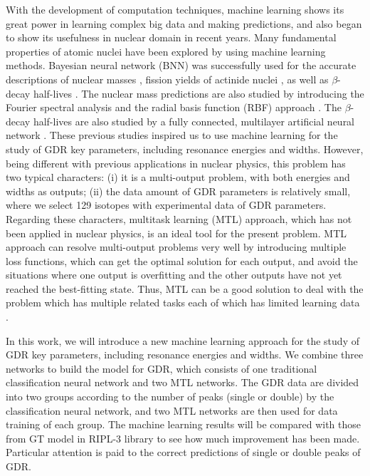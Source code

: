 \documentclass[twocolumn,showpacs,superscriptaddress,amsmath,amssymb,prc,preprintnumbers]{revtex4-1}
\begin{document}
With the development of computation techniques, machine learning shows its great power in learning complex big data and making predictions, and also began to show its usefulness in nuclear domain in recent years.
Many fundamental properties of atomic nuclei have been explored by using machine learning methods.
Bayesian neural network (BNN) was successfully used for the accurate descriptions of  nuclear masses \cite{Niu201848,Niu20198,Utama2016,Neufcourt2018}, fission yields of actinide nuclei \cite{WangZiAo2019}, as well as $\beta$-decay half-lives \cite{NiuZM2019}.
The nuclear mass predictions are also studied by introducing the Fourier spectral analysis \cite{Niu2018scibull} and the radial basis function (RBF) approach \cite{Niu2016}.
The $\beta$-decay half-lives are also studied by a fully connected, multilayer artificial neural network \cite{Costiris2009,Costiris2013}.
These previous studies inspired us to use  machine learning for the study of GDR key parameters, including resonance energies and widths. However, being different with previous applications in nuclear physics, this problem has two typical characters: (i) it is a multi-output problem, with both energies and widths as outputs; (ii) the data amount of GDR parameters is relatively small, where we select 129 isotopes with experimental data of GDR parameters.  Regarding these characters, multitask learning (MTL) \cite{Caruana001, zhang2017survey} approach, which has not been applied in nuclear physics,  is an ideal tool for the present problem. MTL approach can resolve multi-output problems very well by introducing multiple loss functions, which can get the optimal solution for each output, and avoid the situations where one output is overfitting and the other outputs have not yet reached the best-fitting state. Thus, MTL can be a good solution to deal with the problem which has multiple related tasks each of which has limited learning data \cite{zhang2017survey}.


In this work, we will introduce a new machine learning approach for the study of  GDR key parameters, including resonance energies and widths.
We combine three networks to build the model for GDR, which consists of one traditional classification neural network and two MTL networks. The GDR data are divided into two groups according to the number of peaks (single or double) by the classification neural network, and two MTL networks are then used for data training of each group. The machine learning results will be compared with those from GT model in RIPL-3 library \cite{RIPL3} to see how much improvement has been made. Particular attention is paid to the correct predictions of single or double peaks of GDR.
\end{document}
